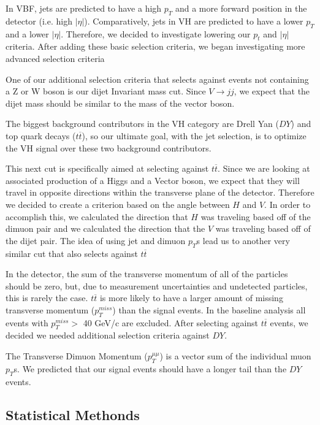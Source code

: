 \documentclass[12pt]{article}
\begin{document}
In VBF, jets are predicted to have a high $p_{T}$ and a more forward position in the detector (i.e. high $|\eta|$). 
Comparatively, jets in VH are predicted to have a lower $p_{T}$ and a lower $|\eta|$. 
Therefore, we decided to investigate lowering our $p_{t}$ and $|\eta|$ criteria. After adding these basic selection criteria,
we began investigating more advanced selection criteria

One of our additional selection criteria that selects against events not containing a Z or W boson is our dijet Invariant mass cut. 
Since $V \rightarrow jj$, we expect that the dijet mass should be similar to the mass of the vector boson. 

The biggest background contributors in the VH category are Drell Yan ($DY$) and top quark decays ($t\overline{t}$), 
so our ultimate goal, with the jet selection, is to optimize the VH signal over these two background contributors.

This next cut is specifically aimed at selecting against $t\overline{t}$.
Since we are looking at associated production of a Higgs and a Vector boson, we expect that they will 
travel in opposite directions within the transverse plane of the detector. 
Therefore we decided to create a criterion based on the angle between $H$ and $V$. 
In order to accomplish this, we calculated the direction that $H$ was traveling based off of the dimuon pair 
and we calculated the direction that the $V$ was traveling based off of the dijet pair. 
The idea of using jet and dimuon $p_{T}$s lead us to another very similar cut that also selects against $t\overline{t}$ 

In the detector, the sum of the transverse momentum of all of the particles should be zero, 
but, due to measurement uncertainties and undetected particles, this is rarely the case. 
$t\overline{t}$ is more likely to have a larger amount of missing transverse momentum ($p_{T}^{miss}$) than the signal events. 
In the baseline analysis all events with $p_{T}^{miss} >$ 40 GeV/c are excluded.
After selecting against $t\overline{t}$ events, we decided we needed additional selection criteria against $DY$.

The Transverse Dimuon Momentum ($p_{T}^{\mu \mu}$) is a vector sum of the individual muon $p_{T}$s. 
We predicted that our signal events should have a longer tail than the $DY$ events.

\subsection{Statistical Methonds}
\end{document}
